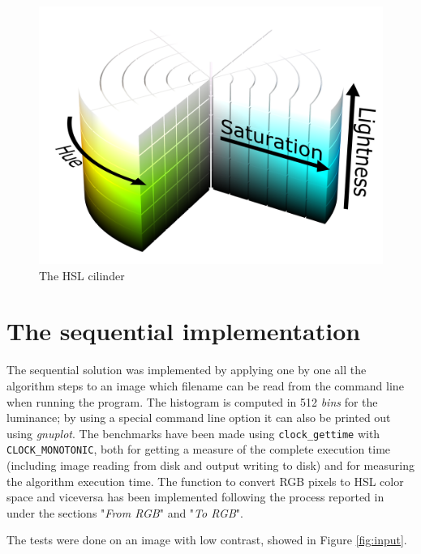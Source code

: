 \documentclass[10pt,twocolumn,letterpaper]{article}
\begin{document}
\begin{figure}[!ht]
    \centering 
    \includegraphics[width=0.8\linewidth]{./img/hsl.png}
    \caption{The HSL cilinder}
    \label{fig:hsl}
\end{figure}

\section{The sequential implementation}

The sequential solution was implemented by applying one by one all the algorithm
steps to an image which filename can be read from the command line when running
the program. The histogram is computed in 512 \emph{bins} for the luminance; by
using a special command line option it can also be printed out using \emph{gnuplot}.
The benchmarks have been made using \verb|clock_gettime| with \verb|CLOCK_MONOTONIC|,
both for getting a measure of the complete execution time (including image reading
from disk and output writing to disk) and for measuring the algorithm execution time.
The function to convert RGB pixels to HSL color space and viceversa has been
implemented following the process reported in \cite{wiki:HSL_and_HSV} under the
sections "\emph{From RGB}" and "\emph{To RGB}".

The tests were done on an image with low contrast, showed in Figure \ref{fig:input}.
\end{document}
